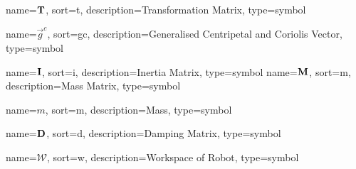 	{%
		name=\ensuremath{\mat{T}},
		sort=t,
		description=Transformation Matrix,
		type=symbol
	}
	\newcommand{\transformationmat}{\gls{sym:transformationmat}}

	{%
		name=\ensuremath{\vec{g}^c},
		sort=gc,
		description=Generalised Centripetal and Coriolis Vector,
		type=symbol
	}
	\newcommand{\centripitalCoriolisVec}{\gls{sym:centripitalCoriolisVec}}

	{%
		name=\ensuremath{\mat{I}},
			sort=i,
			description=Inertia Matrix,
			type=symbol
		}
		\newcommand{\inertiamat}{\gls{sym:inertiamat}}
	{%
		name=\ensuremath{\mat{M}},
		sort=m,
		description=Mass Matrix,
		type=symbol
	}
	\newcommand{\massmat}{\gls{sym:massmat}}

	{%
		name=\ensuremath{m},
		sort=m,
		description=Mass,
		type=symbol
	}
	\newcommand{\mass}{\gls{sym:mass}}

	{%
		name=\ensuremath{\mat{D}},
		sort=d,
		description=Damping Matrix,
		type=symbol
	}
	\newcommand{\dampingmat}{\gls{sym:dampingmat}}

	{%
		name=\ensuremath{\mathcal{W}},
		sort=w,
		description=Workspace of Robot,
		type=symbol
	}
	\newcommand{\workspace}{\gls{sym:workspace}}

